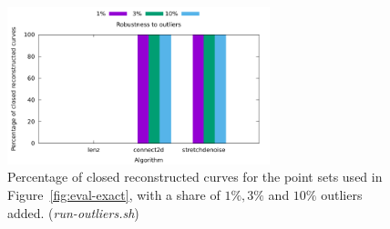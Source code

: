 \begin{figure}
	\centering
	\includegraphics[width=3in]{fig/outliers.pdf}
	\caption{Percentage of closed reconstructed curves for the point sets used in Figure~\ref{fig:eval-exact}, with a share of $1\%, 3\%$ and $10\%$ outliers added. ({\em run-outliers.sh})}
	\label{fig:eval-outliers}
\end{figure}






